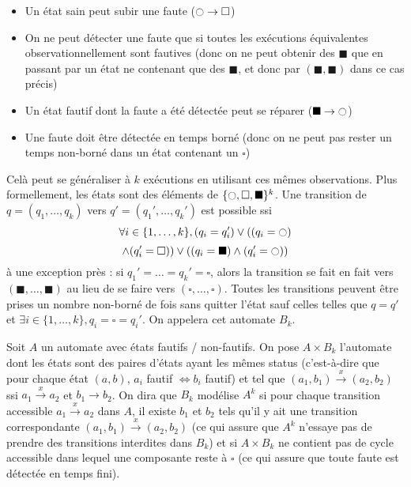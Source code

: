 \documentclass[conference]{IEEEtran}
\newcommand{\es}{\square}
\newcommand{\fs}{\blacksquare}
\newcommand{\ec}{\ocircle}
\begin{document}
\begin{itemize}
	\item Un état sain peut subir une faute ($\ec \to \es$)
	\item On ne peut détecter une faute que si toutes les exécutions équivalentes observationnellement sont fautives (donc on ne peut obtenir des $\fs$ que en passant par un état ne contenant que des $\fs$, et donc par $(\fs,\fs)$ dans ce cas précis)
	\item Un état fautif dont la faute a été détectée peut se réparer ($\fs\to \ec$)
	\item Une faute doit être détectée en temps borné (donc on ne peut pas rester un temps non-borné dans un état contenant un $\es$)
\end{itemize}

Celà peut se généraliser à $k$ exécutions en utilisant ces mêmes observations. Plus formellement, les états sont des éléments de $\{\ec, \es, \fs \}^k$. Une transition de $q=(q_1, \dots, q_k)$ vers $q'=(q_1',\dots,q_k')$ est possible ssi $$\forall i \in \{1, \dots, k\}, (q_i = q_i')\lor ((q_i = \ec) $$$$\land (q_i'=\es)) \lor ((q_i = \fs)\land (q_i' = \ec))$$
\`a une exception près : si $q_1'=\dots=q_k'=\es$, alors la transition se fait en fait vers $(\fs, \dots, \fs)$ au lieu de se faire vers $(\es, \dots, \es)$. Toutes les transitions peuvent être prises un nombre non-borné de fois sans quitter l'état sauf celles telles que $q= q'$ et $\exists i\in \{1, \dots, k\}, q_i = \es = q_i'$. On appelera cet automate $B_k$.

Soit $A$ un automate avec états fautifs / non-fautifs. On pose $A\times B_k$ l'automate dont les états sont des paires d'états ayant les mêmes status (c'est-à-dire que pour chaque état $(a, b)$, $a_i$ fautif $\iff b_i$ fautif) et tel que $(a_1,b_1)\overset{x}{\to}(a_2, b_2)$ ssi $a_1\overset{x}{\to} a_2$ et $b_1 \to b_2$. On dira que $B_k$ modélise $A^k$ si pour chaque transition accessible $a_1\overset{x}{\to} a_2$ dans $A$, il existe $b_1$ et $b_2$ tels qu'il y ait une transition correspondante $(a_1,b_1)\overset{x}{\to}(a_2, b_2)$ (ce qui assure que $A^k$ n'essaye pas de prendre des transitions interdites dans $B_k$) et si $A\times B_k$ ne contient pas de cycle accessible dans lequel une composante reste à $\es$ (ce qui assure que toute faute est détectée en temps fini). 
\end{document}
